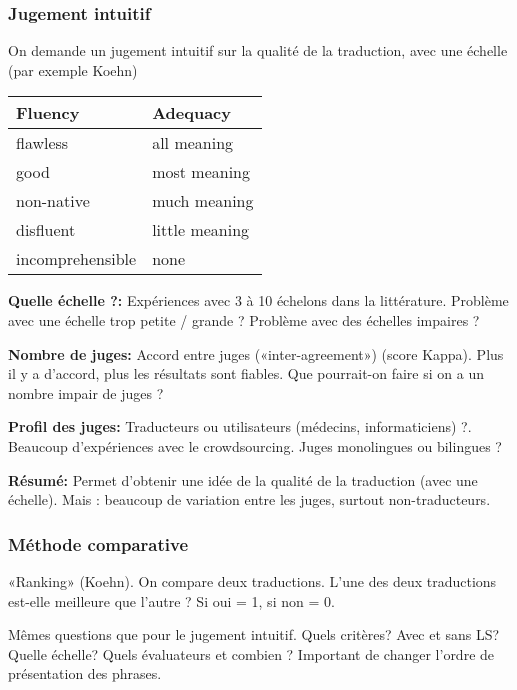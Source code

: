 \subsubsection{Jugement intuitif}

On demande un jugement intuitif sur la qualité de la traduction, avec une échelle (par exemple Koehn)

\begin{table}[H]
    \centering
    \begin{tabular}{|l|l|}
    \hline
    \textbf{Fluency} & \textbf{Adequacy}       \\ \hline
    flawless         & all meaning             \\ \hline
    good             & most meaning            \\ \hline
    non-native       & much meaning            \\ \hline
    disfluent        & little meaning          \\ \hline
    incomprehensible & none                    \\ \hline
    \end{tabular}
\end{table}


\textbf{Quelle échelle ?:}
Expériences avec 3 à 10 échelons dans la littérature. Problème avec une échelle trop petite / grande ? Problème avec des échelles impaires ?

\textbf{Nombre de juges:}
Accord entre juges («inter-agreement») (score Kappa). Plus il y a d’accord, plus les résultats sont fiables. Que pourrait-on faire si on a un nombre impair de juges ?

\textbf{Profil des juges:}
Traducteurs ou utilisateurs (médecins, informaticiens) ?. Beaucoup d’expériences avec le crowdsourcing. Juges monolingues ou bilingues ?

\textbf{Résumé:}
Permet d’obtenir une idée de la qualité de la traduction (avec une échelle). Mais : beaucoup de variation entre les juges, surtout non-traducteurs.

\subsubsection{Méthode comparative}

«Ranking» (Koehn).
On compare deux traductions. L’une des deux traductions est-elle meilleure que l’autre ? Si oui = 1, si non = 0.

Mêmes questions que pour le jugement intuitif. Quels critères? Avec et sans LS? Quelle échelle? Quels évaluateurs et combien ? Important de changer l’ordre de présentation des phrases.

